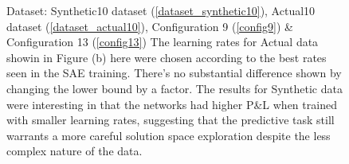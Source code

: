 \documentclass[a4paper,11pt,oneside]{article}
\theoremstyle{plain}
\theoremstyle{definition}
\begin{document}
\begin{figure}[H]
\begin{subfigure}{.5\textwidth}
{				\newline }
			\label{figure-actual_pl_minmax_lr}
		\end{subfigure}
		\caption[P\&L by Learning Rates]{Dataset: Synthetic10 dataset (\ref{dataset_synthetic10}), Actual10 dataset (\ref{dataset_actual10}), Configuration 9 (\ref{config9}) \& Configuration 13 (\ref{config13})
			\newline The learning rates for Actual data showin in Figure (b) here were chosen according to the best rates seen in the SAE training. There's no substantial difference shown by changing the lower bound by a factor. The results for Synthetic data were interesting in that the networks had higher P\&L when trained with smaller learning rates, suggesting that the predictive task still warrants a more careful solution space exploration despite the less complex nature of the data.}
		\label{figure-pl_lr}
	\end{figure}
	
\end{document}
